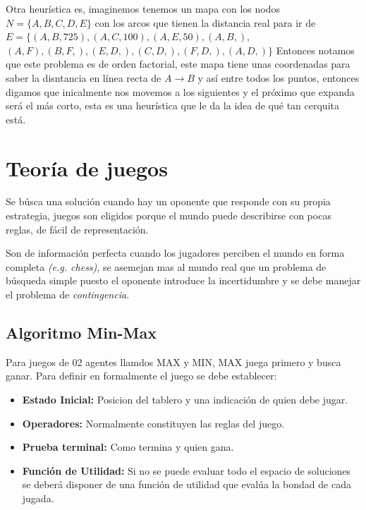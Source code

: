 \documentclass[tikz,11pt,fleqn]{book} %
\begin{document}
Otra heurística es, imaginemos tenemos un mapa con los nodos
$N=\{A, B, C, D, E\}$ con los arcos que tienen la distancia real para ir de $E=\{(A, B, 725), (A, C, 100), (A, E, 50), (A, B, ),$ $(A, F), (B, F, ), (E, D, ), (C, D, ), (F, D, ), (A, D, )\}$
Entonces notamos que este problema es de orden factorial, este mapa tiene unas coordenadas para saber la disntancia en línea recta de $A\to B$ y así entre todos los puntos, entonces digamos que inicalmente nos movemos a los siguientes y el próximo que expanda será el más corto, esta es una heurística que le da la idea de qué tan cerquita está.



\section{Teoría de juegos}
Se búsca una solución cuando hay un oponente que responde con su propia estrategia, juegos son eligidos porque el mundo puede describirse con pocas reglas, de fácil de representación.

Son de información perfecta cuando los jugadores perciben el mundo en forma completa \textit{(e.g. chess)}, se asemejan mas al mundo real que un problema de búsqueda simple puesto el oponente introduce la incertidumbre y se debe manejar el problema de \textit{contingencia}.

\subsection{Algoritmo Min-Max}
Para juegos de 02 agentes llamdos MAX y MIN, MAX juega primero y busca ganar.
Para definir en formalmente el juego se debe establecer:

\begin{itemize}
    \item \textbf{Estado Inicial:} Posicion del tablero y una indicación de quien debe jugar.
    \item \textbf{Operadores:} Normalmente constituyen las reglas del juego.
    \item \textbf{Prueba terminal:} Como termina y quien gana.
    \item \textbf{Función de Utilidad:} Si no se puede evaluar todo el espacio de soluciones se deberá disponer de una función de utilidad que evalúa la bondad de cada jugada.
    
\end{itemize}
\end{document}
